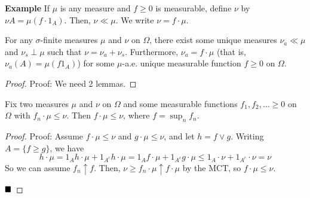 \begin{example}{\textbf{Example}}
    If $\mu$ is any measure and $f \geq 0$ is measurable, define $\nu$ by $\nu A = \mu(f \cdot 1_{A})$. Then, $\nu \ll \mu$. We write $\nu = f \cdot \mu$.
\end{example}

\begin{theorem}
    For any $\sigma$-finite measures $\mu$ and $\nu$ on $\Omega$, there exist some unique measures $\nu_{a} \ll \mu$ and $\nu_{s} \perp \mu$ such that $\nu = \nu_{a} + \nu_{s}$. Furthermore, $\nu_{a} = f \cdot \mu$ (that is, $\nu_{a}(A) = \mu(f1_{A})$) for some $\mu$-a.e. unique measurable function $f \geq 0$ on $\Omega$.
\end{theorem}
\begin{proof}{Proof:}
    We need 2 lemmas.
\end{proof}

\begin{lemma}
    Fix two measures $\mu$ and $\nu$ on $\Omega$ and some measurable functions $f_1, f_2, \ldots \geq 0$ on $\Omega$ with $f_n \cdot \mu \leq \nu$. Then $f \cdot \mu \leq \nu$, where $f = \sup_{n} f_n$.
\end{lemma}
\begin{proof}{Proof:}
    Assume $f \cdot \mu \leq \nu$ and $g \cdot \mu \leq \nu$, and let $h = f \vee g$. Writing $A = \{f \geq g\}$, we have
    \[ h \cdot \mu = 1_{A}h \cdot \mu + 1_{A^{c}}h \cdot \mu = 1_{A}f \cdot \mu + 1_{A^{c}}g \cdot \mu \leq 1_{A} \cdot \nu + 1_{A^{c}} \cdot \nu = \nu \]
    So we can assume $f_n \uparrow f$. Then, $\nu \geq f_n \cdot \mu \uparrow f \cdot \mu$ by the MCT, so $f \cdot \mu \leq \nu$.

    $\qed$
\end{proof}
